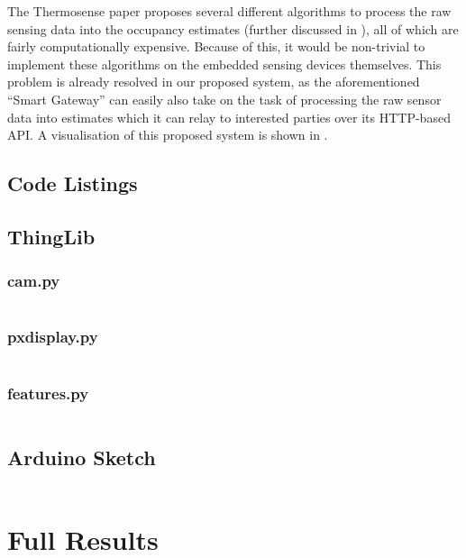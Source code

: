 The Thermosense paper \cite{beltran2013thermosense} proposes several different algorithms to process the raw sensing data into the occupancy estimates (further discussed in ), all of which are fairly computationally expensive. Because of this, it would be non-trivial to implement these algorithms on the embedded sensing devices themselves. This problem is already resolved in our proposed system, as the aforementioned ``Smart Gateway'' can easily also take on the task of processing the raw sensor data into estimates which it can relay to interested parties over its HTTP-based API. A visualisation of this proposed system is shown in .

\begin{landscape}
\chapter{Code Listings}


\section{ThingLib}
\subsection{cam.py}
\inputminted[fontsize=\footnotesize,breaklines=true,numbers=right]{python}{../../code/processing/thinglib/cam.py}
\subsection{pxdisplay.py}
\inputminted[fontsize=\footnotesize,breaklines=true,numbers=right]{python}{../../code/processing/thinglib/pxdisplay.py}
\subsection{features.py}
\inputminted[fontsize=\footnotesize,breaklines=true,numbers=right]{python}{../../code/processing/thinglib/features.py}

\section{Arduino Sketch}
\inputminted[fontsize=\footnotesize,breaklines=true,numbers=right]{C++}{../../code/mlx90620_driver/mlx90620_driver.ino}

\end{landscape}


\chapter{Full Results}


